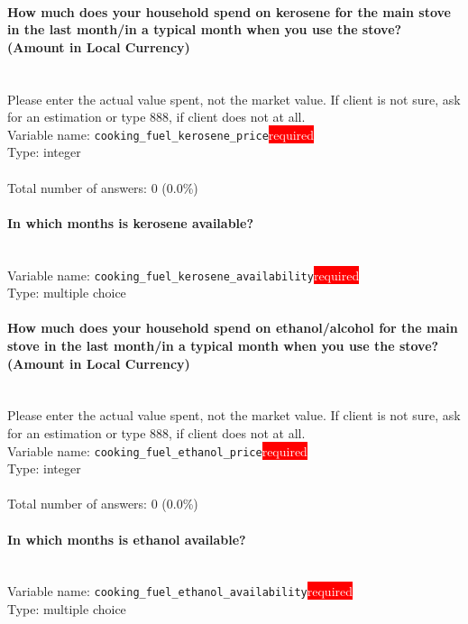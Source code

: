 \documentclass[11.5pt, a4paper]{scrartcl}
\begin{document}
\paragraph{How much does your household spend on kerosene for the main stove in the last month/in a typical month when you use the stove? (Amount in Local Currency) }
\ \\ {\small Please enter the actual value spent, not the market value. If client is not sure, ask for an estimation or type 888, if client does not at all. }
\  \\Variable name: \texttt{cooking\_fuel\_kerosene\_price}\hfill\colorbox{red}{\small{\textcolor{white}{required}}}\\
 Type: integer\\
\\Total number of answers: 0 (0.0\%)
\\[0.2em]\paragraph{In which months is kerosene available?}
\  \\Variable name: \texttt{cooking\_fuel\_kerosene\_availability}\hfill\colorbox{red}{\small{\textcolor{white}{required}}}\\
 Type: multiple choice\\
\paragraph{How much  does your household spend on ethanol/alcohol for the main stove in the last month/in a typical month when you use the stove? (Amount in Local Currency) }
\ \\ {\small Please enter the actual value spent, not the market value. If client is not sure, ask for an estimation or type 888, if client does not at all. }
\  \\Variable name: \texttt{cooking\_fuel\_ethanol\_price}\hfill\colorbox{red}{\small{\textcolor{white}{required}}}\\
 Type: integer\\
\\Total number of answers: 0 (0.0\%)
\\[0.2em]\paragraph{In which months is ethanol available?}
\  \\Variable name: \texttt{cooking\_fuel\_ethanol\_availability}\hfill\colorbox{red}{\small{\textcolor{white}{required}}}\\
 Type: multiple choice\\
\end{document}
